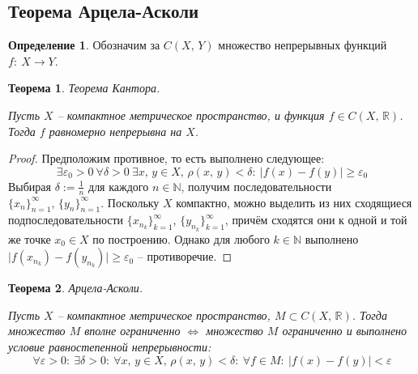 \documentclass[a4paper,12pt]{article}
\renewcommand{\geq}{\ensuremath{\geqslant}}
\theoremstyle{plain}
\newtheorem{theorem}{Теорема}[section]
\theoremstyle{definition}
\newtheorem{definition}{Определение}[section]
\theoremstyle{remark}
\begin{document}
\subsection{Теорема Арцела-Асколи}
\begin{definition}
	Обозначим за $C(X,\, Y)$ множество непрерывных функций $f:\: X \to Y$.
\end{definition}

\begin{theorem}
	Теорема Кантора.

	Пусть $X$ -- компактное метрическое пространство, и функция $f \in C(X,\, \mathbb{R})$. Тогда $f$ равномерно непрерывна на $X$.
\end{theorem}

\begin{proof}
	Предположим противное, то есть выполнено следующее:
	\[
		\exists \varepsilon_0 > 0 \: \forall \delta > 0 \: \exists x,\,y \in X,\, \rho(x,\, y) < \delta :\: \vert f(x) - f(y)\vert \geq \varepsilon_0
	\]
	Выбирая $\delta := \frac{1}{n}$ для каждого $n \in \mathbb{N}$, получим последовательности $\{x_n\}_{n=1}^\infty,\, \{y_n\}_{n=1}^\infty$. Поскольку $X$ компактно, можно выделить из них сходящиеся подпоследовательности $\{x_{n_k}\}_{k=1}^\infty$, $\{y_{n_k}\}_{k=1}^\infty$, причём сходятся они к одной и той же точке $x_0 \in X$ по построению. Однако для любого $k \in \mathbb{N}$ выполнено $\vert f(x_{n_k}) - f(y_{n_k})\vert \geq \varepsilon_0$ -- противоречие.
\end{proof}

\begin{theorem}
	Арцела-Асколи.

	Пусть $X$ -- компактное метрическое пространство, $M \subset C(X,\, \mathbb{R})$. Тогда множество $M$ вполне ограниченно $\Leftrightarrow$ множество $M$ ограниченно и выполнено условие равностепенной непрерывности:
	\[
		\forall \varepsilon > 0 :\: \exists \delta > 0 :\: \forall x,\, y \in X,\, \rho(x,\, y) < \delta :\: \forall f \in M :\: \vert f(x) - f(y)\vert < \varepsilon
	\]
\end{theorem}
\end{document}
